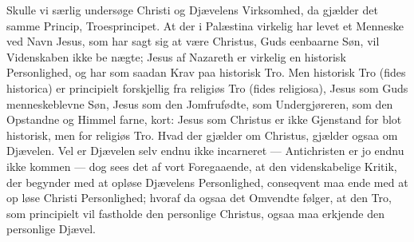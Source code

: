 \documentclass[12pt,a4paper]{article}
\newcommand{\opage}[1]{\marginnote{\footnotesize\textit{[#1]}}}
\begin{document}
Skulle vi særlig undersøge Christi og Djævelens Virksomhed,
da gjælder det samme Princip, Troesprincipet. At der i Palæstina
virkelig har levet et Menneske ved Navn Jesus, som har sagt sig
at være Christus, Guds eenbaarne Søn, vil Videnskaben ikke be\-%
nægte; Jesus af Nazareth er virkelig en historisk Personlighed,
og har som saadan Krav paa historisk Tro. Men historisk Tro
(fides historica) er principielt forskjellig fra religiøs Tro (fides
religiosa), Jesus som Guds menneskeblevne Søn, Jesus som den
Jomfrufødte, som Undergjøreren, som den Opstandne og Himmel\-%
farne, kort: Jesus som Christus er ikke Gjenstand for blot historisk,
men for religiøs Tro. Hvad der gjælder om Christus, gjælder
ogsaa om Djævelen. Vel er Djævelen selv endnu ikke incarneret
--- Antichristen er jo endnu ikke kommen --- dog sees det af vort
Foregaaende, at den videnskabelige Kritik, der begynder med at
\opage{52}opløse Djævelens Personlighed, conseqvent maa ende med at op\-%
løse Christi Personlighed; hvoraf da ogsaa det Omvendte følger,
at den Tro, som principielt vil fastholde den personlige Christus,
ogsaa maa erkjende den personlige Djævel.
\end{document}
